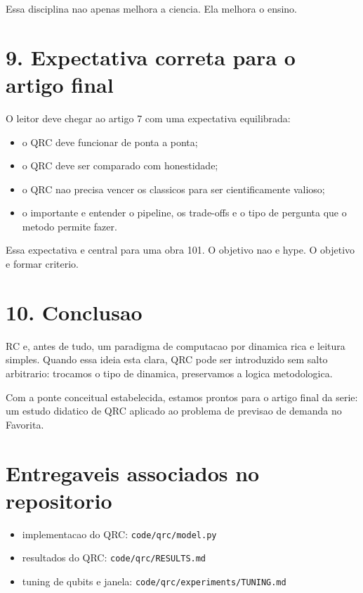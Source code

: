 \documentclass[12pt]{article}
\providecommand{\tightlist}{%
  \setlength{\itemsep}{0pt}\setlength{\parskip}{0pt}}
\begin{document}
Essa disciplina nao apenas melhora a ciencia. Ela melhora o ensino.

\section{9. Expectativa correta para o artigo final}\label{9-expectativa-correta-para-o-artigo-final}

O leitor deve chegar ao artigo 7 com uma expectativa equilibrada:

\begin{itemize}
\tightlist
\item
  o QRC deve funcionar de ponta a ponta;
\item
  o QRC deve ser comparado com honestidade;
\item
  o QRC nao precisa vencer os classicos para ser cientificamente valioso;
\item
  o importante e entender o pipeline, os trade-offs e o tipo de pergunta que o metodo permite fazer.
\end{itemize}

Essa expectativa e central para uma obra 101. O objetivo nao e hype. O objetivo e formar criterio.

\section{10. Conclusao}\label{10-conclusao}

RC e, antes de tudo, um paradigma de computacao por dinamica rica e leitura simples. Quando essa ideia esta clara, QRC pode ser introduzido sem salto arbitrario: trocamos o tipo de dinamica, preservamos a logica metodologica.

Com a ponte conceitual estabelecida, estamos prontos para o artigo final da serie: um estudo didatico de QRC aplicado ao problema de previsao de demanda no Favorita.

\section{Entregaveis associados no repositorio}\label{entregaveis-associados-no-repositorio}

\begin{itemize}
\tightlist
\item
  implementacao do QRC: \texttt{code/qrc/model.py}
\item
  resultados do QRC: \texttt{code/qrc/RESULTS.md}
\item
  tuning de qubits e janela: \texttt{code/qrc/experiments/TUNING.md}
\end{itemize}
\end{document}
